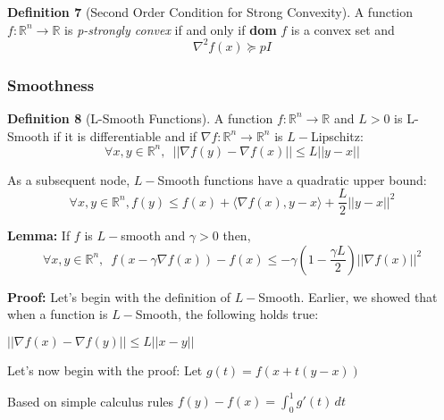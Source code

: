 \noindent \textbf{Definition 7} (Second Order Condition for Strong Convexity). A function $f: \mathbb{R}^n \rightarrow \mathbb{R}$ is \textit{p-strongly convex} if and only if \textbf{dom} $f$ is a convex set and 
\begin{equation}
    \nabla^2 f(x) \succeq pI
\end{equation}

\subsubsection{Smoothness}
\noindent \textbf{Definition 8} (L-Smooth Functions). A function $f: \mathbb{R}^n \rightarrow \mathbb{R}$ and $L > 0$ is L-Smooth if it is differentiable and if $\nabla f: \mathbb{R}^n \rightarrow \mathbb{R}^n$ is $L-$Lipschitz: 
\begin{equation}
    \forall x, y \in \mathbb{R}^n, \enspace ||\nabla f(y) - \nabla f(x)|| \leq L ||y - x||
\end{equation}

\noindent As a subsequent node, $L-$Smooth functions have a quadratic upper bound: 
\begin{equation}
    \forall x, y \in \mathbb{R}^n, f(y) \leq f(x) + \langle \nabla f(x), y - x \rangle + \frac{L}{2} ||y - x||^2
\end{equation}

\noindent \textbf{Lemma:} If $f$ is $L-$smooth and $\gamma > 0$ then, 
\begin{equation}
    \forall x, y \in \mathbb{R}^n, \enspace f(x - \gamma \nabla f(x)) - f(x) \leq -\gamma (1 - \frac{\gamma L}{2}) ||\nabla f(x)||^2
\end{equation}

\noindent \textbf{Proof:}  \newline 
Let's begin with the definition of $L-$Smooth. Earlier, we showed that when a function is $L-$Smooth, the following holds true: \newline 

$||\nabla f(x) - \nabla f(y)|| \leq L ||x - y||$ \newline


Let's now begin with the proof: \newline
Let $g(t) = f(x + t(y - x))$ \newline 

Based on simple calculus rules \newline 
$f(y) - f(x) = \int_{0}^{1} g'(t) \,dt$ \newline 


